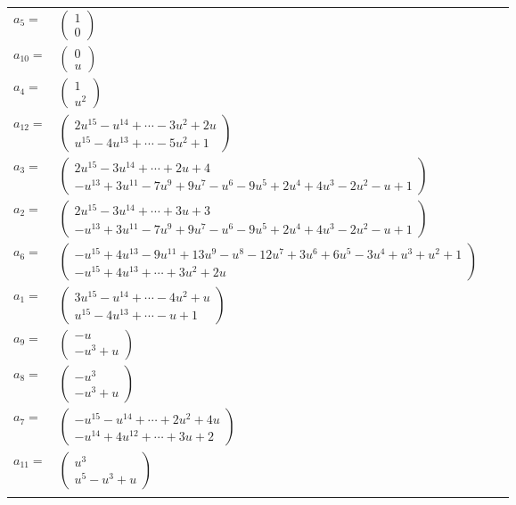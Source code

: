 \documentclass[1p]{elsarticle_modified}
\theoremstyle{definition}
\begin{document}
\begin{tabular}{m{7pt} m{180pt} m{7pt} m{180pt} }
\flushright $a_{5}=$&$\begin{pmatrix}1\\0\end{pmatrix}$ \\
\flushright $a_{10}=$&$\begin{pmatrix}0\\u\end{pmatrix}$ \\
\flushright $a_{4}=$&$\begin{pmatrix}1\\u^2\end{pmatrix}$ \\
\flushright $a_{12}=$&$\begin{pmatrix}2 u^{15}- u^{14}+\cdots-3 u^2+2 u\\u^{15}-4 u^{13}+\cdots-5 u^2+1\end{pmatrix}$ \\
\flushright $a_{3}=$&$\begin{pmatrix}2 u^{15}-3 u^{14}+\cdots+2 u+4\\- u^{13}+3 u^{11}-7 u^9+9 u^7- u^6-9 u^5+2 u^4+4 u^3-2 u^2- u+1\end{pmatrix}$ \\
\flushright $a_{2}=$&$\begin{pmatrix}2 u^{15}-3 u^{14}+\cdots+3 u+3\\- u^{13}+3 u^{11}-7 u^9+9 u^7- u^6-9 u^5+2 u^4+4 u^3-2 u^2- u+1\end{pmatrix}$ \\
\flushright $a_{6}=$&$\begin{pmatrix}- u^{15}+4 u^{13}-9 u^{11}+13 u^9- u^8-12 u^7+3 u^6+6 u^5-3 u^4+u^3+u^2+1\\- u^{15}+4 u^{13}+\cdots+3 u^2+2 u\end{pmatrix}$ \\
\flushright $a_{1}=$&$\begin{pmatrix}3 u^{15}- u^{14}+\cdots-4 u^2+u\\u^{15}-4 u^{13}+\cdots- u+1\end{pmatrix}$ \\
\flushright $a_{9}=$&$\begin{pmatrix}- u\\- u^3+u\end{pmatrix}$ \\
\flushright $a_{8}=$&$\begin{pmatrix}- u^3\\- u^3+u\end{pmatrix}$ \\
\flushright $a_{7}=$&$\begin{pmatrix}- u^{15}- u^{14}+\cdots+2 u^2+4 u\\- u^{14}+4 u^{12}+\cdots+3 u+2\end{pmatrix}$ \\
\flushright $a_{11}=$&$\begin{pmatrix}u^3\\u^5- u^3+u\end{pmatrix}$\\&\end{tabular}
\end{document}
